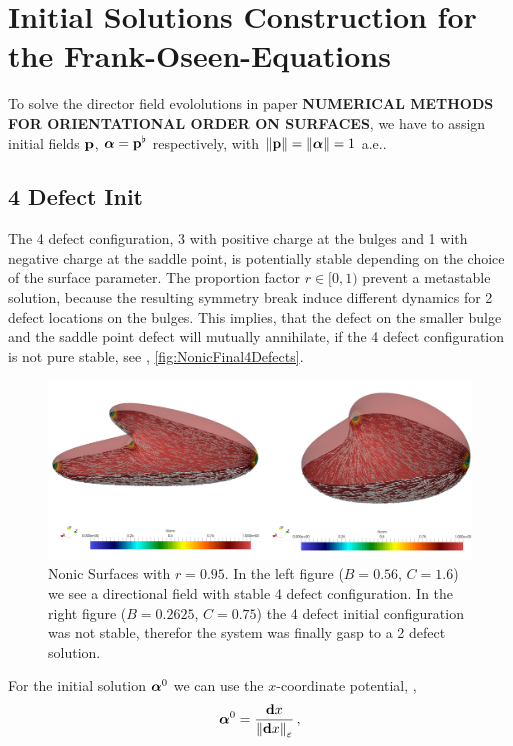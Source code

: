 \documentclass[a4paper,11pt]{scrartcl}
\newcommand{\pstretch}{C}
\newcommand{\pprop}{r}
\newcommand{\ppress}{B}
\begin{document}
\section{Initial Solutions Construction for the Frank-Oseen-Equations}
To solve the director field evololutions in paper \textbf{NUMERICAL METHODS FOR ORIENTATIONAL ORDER ON SURFACES},
we have to assign initial fields \( \mathbf{p} \), \( \bm{\alpha} = \mathbf{p}^{\flat} \) respectively,
with \( \|\mathbf{p}\| = \|\bm{\alpha}\| = 1 \) a.e..
\subsection{4 Defect Init}
The 4 defect configuration, 3 with positive charge at the bulges and 1 with negative charge at the saddle point, 
is potentially stable depending on the choice of the surface
parameter.
The proportion factor \( \pprop\in[0,1) \) prevent a metastable solution, because the resulting symmetry break induce different dynamics
for  2 defect locations on the bulges.
This implies, that the defect on the smaller bulge and the saddle point defect will mutually annihilate, if the 4 defect configuration is
not pure stable, see \eg, \autoref{fig:NonicFinal4Defects}. 
\begin{figure}
  \centering
  \includegraphics[width=.95\textwidth]{stuff/paraview/NonicFinal4Defects.png}
  \caption{Nonic Surfaces with \( \pprop = 0.95 \). 
            In the left figure (\( \ppress = 0.56 \), \( \pstretch = 1.6 \)) we see a directional field with stable 4 defect configuration.
            In the right figure (\( \ppress = 0.2625 \), \( \pstretch = 0.75 \)) the 4 defect initial configuration was not stable,
            therefor the system was finally gasp to a 2 defect solution.
           }
  \label{fig:NonicFinal4Defects}
\end{figure}
For the initial solution \( \bm{\alpha}^{0} \) we can use the \( x \)-coordinate potential, \ie,
\begin{align}
  \bm{\alpha}^{0} = \frac{\mathbf{d} x}{\left\| \mathbf{d} x \right\|_{\varepsilon}} \,\text{,}
\end{align}
\end{document}
